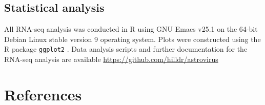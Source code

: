 \documentclass[11pt]{article}
\begin{document}
\subsection*{{\bfseries\sffamily } Statistical analysis}
\label{sec:org898cade}
All RNA-seq analysis was conducted in R \cite{CRAN:2017} using GNU Emacs v25.1 \cite{Stallman:1981:EEC:1159890.806466} on the 64-bit Debian Linux stable version 9 operating system. Plots were constructed using the R package \texttt{ggplot2} \cite{Wickham:2009}. Data analysis scripts and further documentation for the RNA-seq analysis are available \url{https://github.com/hilldr/astrovirus}

\section*{{\bfseries\sffamily } References}
\label{sec:org8261dc1}
\let\oldbibliography\thebibliography
\renewcommand{\thebibliography}[1]{\oldbibliography{#1}
\setlength{\itemsep}{-1pt}} %
\footnotesize{ %

}\normalsize
\end{document}
